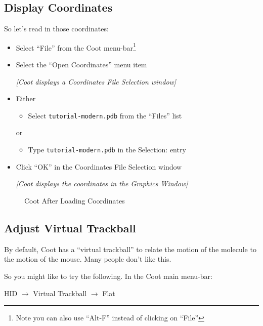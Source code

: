 \documentclass{article}
\begin{document}
\subsection{Display Coordinates}
So let's read in those coordinates:

\begin{itemize}
\item Select \textsf{``File''} from the Coot menu-bar\footnote{Note
    you can also use ``Alt-F'' instead of clicking on ``File''}
\item Select the \textsf{``Open Coordinates''} menu item

\textsl{  [Coot displays a Coordinates File Selection window]}

\item Either
  \begin{itemize}
  \item Select \texttt{tutorial-modern.pdb} from the ``Files'' list
  \end{itemize}
  or
  \begin{itemize}
  \item Type \texttt{tutorial-modern.pdb} in the Selection: entry
  \end{itemize}
\item Click \textsf{``OK''} in the Coordinates File Selection window

\textsl{  [Coot displays the coordinates in the Graphics Window]}

\end{itemize}

\begin{figure}[htbp]
  \begin{center}
    \leavevmode
    \epsfxsize 70mm
    \caption{Coot After Loading Coordinates}
    \label{fig:coordinates-coot}
  \end{center}
\end{figure}

\subsection{Adjust Virtual Trackball}
By default, Coot has a ``virtual trackball'' to relate the motion of
the molecule to the motion of the mouse.  Many people don't like this.

So you might like to try the following. In the Coot main menu-bar:

\textsf{HID $\rightarrow$ Virtual Trackball $\rightarrow$ Flat}
\end{document}
